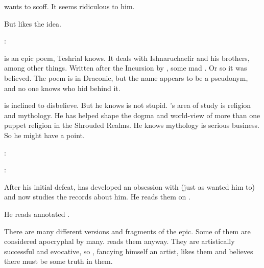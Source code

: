 \begin{prose}
  \Teshrial{} wants to scoff. 
  It seems ridiculous to him. 
  
  But \Menessiaraid{} likes the idea.
  
  \Teshrial: 
  
  
  \WanderersInDarkness is an epic poem, Teshrial knows.
  It deals with Ishnaruchaefir and his brothers, among other things. 
  Written after the Incursion by \Melcryth, some mad \dragon.
  Or so it was believed.
  The poem is in Draconic, but the name \quo{\Melcryth} appears to be a pseudonym, and no one knows who hid behind it. 
  
  \Teshrial{} is inclined to disbelieve. 
  But he knows \Menessiaraid{} is not stupid.
  \Menessiaraid{}'s area of study is religion and mythology.
  He has helped shape the dogma and world-view of more than one puppet religion in the Shrouded Realms.
  He knows mythology is serious business.
  So he might have a point.
  
  \Menessiaraid:
  
  \Teshrial: 
\end{prose}

After his initial defeat, \Teshrial{} has developed an obsession with \Ishnaruchaefir{} (just as \Ishnaruchaefir{} wanted him to) and now studies the records about him. 
He reads them on . 

He reads  annotated \emph{}. 

There are many different versions and fragments of the epic. 
Some of them are considered apocryphal by many. 
\Teshrial{} reads them anyway. 
They are artistically successful and evocative, so \Teshrial, fancying himself an artist, likes them and believes there must be some truth in them. 






